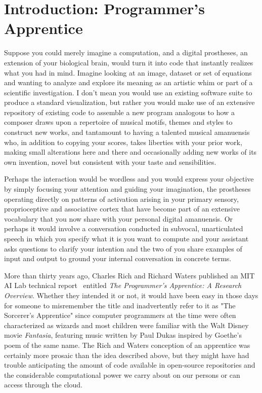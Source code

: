 
\section{Introduction: Programmer's Apprentice}


Suppose you could merely imagine a computation, and a digital prostheses, an extension of your biological brain, would turn it into code that instantly realizes what you had in mind. Imagine looking at an image, dataset or set of equations and wanting to analyze and explore its meaning as an artistic whim or part of a scientific investigation. I don't mean you would use an existing software suite to produce a standard visualization, but rather you would make use of an extensive repository of existing code to assemble a new program analogous to how a composer draws upon a repertoire of musical motifs, themes and styles to construct new works, and tantamount to having a talented musical amanuensis who, in addition to copying your scores, takes liberties with your prior work, making small alterations here and there and occasionally adding new works of its own invention, novel but consistent with your taste and sensibilities.

Perhaps the interaction would be wordless and you would express your objective by simply focusing your attention and guiding your imagination, the prostheses operating directly on patterns of activation arising in your primary sensory, proprioceptive and associative cortex that have become part of an extensive vocabulary that you now share with your personal digital amanuensis. Or perhaps it would involve a conversation conducted in subvocal, unarticulated speech in which you specify what it is you want to compute and your assistant asks questions to clarify your intention and the two of you share examples of input and output to ground your internal conversation in concrete terms. 

More than thirty years ago, Charles Rich and Richard Waters published an MIT AI Lab technical report~\cite{RichandWatersAIM-87} entitled {\it{The Programmer's Apprentice: A Research Overview}}. Whether they intended it or not, it would have been easy in those days for someone to misremember the title and inadvertently refer to it as "The Sorcerer's Apprentice" since computer programmers at the time were often characterized as wizards and most children were familiar with the Walt Disney movie {\it{Fantasia}}, featuring music written by Paul Dukas inspired by Goethe's poem of the same name. The Rich and Waters conception of an apprentice was certainly more prosaic than the idea described above, but they might have had trouble anticipating the amount of code available in open-source repositories and the considerable computational power we carry about on our persons or can access through the cloud.

